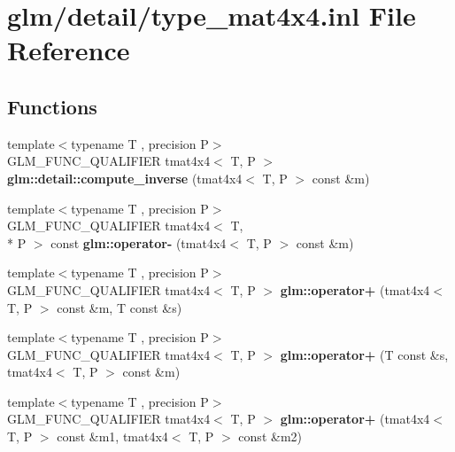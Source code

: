 \hypertarget{type__mat4x4_8inl}{\section{glm/detail/type\-\_\-mat4x4.inl File Reference}
\label{type__mat4x4_8inl}
}
\subsection*{Functions}
\begin{DoxyCompactItemize}
\item 
\hypertarget{namespaceglm_1_1detail_aafe2452828abf1097ad0a95d66f79c45}{{\footnotesize template$<$typename T , precision P$>$ }\\G\-L\-M\-\_\-\-F\-U\-N\-C\-\_\-\-Q\-U\-A\-L\-I\-F\-I\-E\-R tmat4x4$<$ T, P $>$ {\bfseries glm\-::detail\-::compute\-\_\-inverse} (tmat4x4$<$ T, P $>$ const \&m)}\label{namespaceglm_1_1detail_aafe2452828abf1097ad0a95d66f79c45}

\item 
\hypertarget{namespaceglm_a101c032084ffeafb1480814c43b9ef82}{{\footnotesize template$<$typename T , precision P$>$ }\\G\-L\-M\-\_\-\-F\-U\-N\-C\-\_\-\-Q\-U\-A\-L\-I\-F\-I\-E\-R tmat4x4$<$ T, \\*
P $>$ const {\bfseries glm\-::operator-\/} (tmat4x4$<$ T, P $>$ const \&m)}\label{namespaceglm_a101c032084ffeafb1480814c43b9ef82}

\item 
\hypertarget{namespaceglm_a8d33b2d0bb5b44913406bc51d992dbb2}{{\footnotesize template$<$typename T , precision P$>$ }\\G\-L\-M\-\_\-\-F\-U\-N\-C\-\_\-\-Q\-U\-A\-L\-I\-F\-I\-E\-R tmat4x4$<$ T, P $>$ {\bfseries glm\-::operator+} (tmat4x4$<$ T, P $>$ const \&m, T const \&s)}\label{namespaceglm_a8d33b2d0bb5b44913406bc51d992dbb2}

\item 
\hypertarget{namespaceglm_adaf33419391a9f6e8779a0f74199013b}{{\footnotesize template$<$typename T , precision P$>$ }\\G\-L\-M\-\_\-\-F\-U\-N\-C\-\_\-\-Q\-U\-A\-L\-I\-F\-I\-E\-R tmat4x4$<$ T, P $>$ {\bfseries glm\-::operator+} (T const \&s, tmat4x4$<$ T, P $>$ const \&m)}\label{namespaceglm_adaf33419391a9f6e8779a0f74199013b}

\item 
\hypertarget{namespaceglm_a25f82613cbb54d1328ba0c087361f23a}{{\footnotesize template$<$typename T , precision P$>$ }\\G\-L\-M\-\_\-\-F\-U\-N\-C\-\_\-\-Q\-U\-A\-L\-I\-F\-I\-E\-R tmat4x4$<$ T, P $>$ {\bfseries glm\-::operator+} (tmat4x4$<$ T, P $>$ const \&m1, tmat4x4$<$ T, P $>$ const \&m2)}\label{namespaceglm_a25f82613cbb54d1328ba0c087361f23a}


\end{DoxyCompactItemize}
